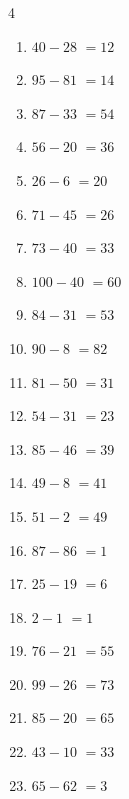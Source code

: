\begin{multicols}{4}
\begin{enumerate}
\columnbreak %

  \item $40-28$
        $=12$

  \item $95-81$
        $=14$

  \item $87-33$
        $=54$

  \item $56-20$
        $=36$

  \item $26-6$
        $=20$

  \item $71-45$
        $=26$

  \item $73-40$
        $=33$

  \item $100-40$
        $=60$

  \item $84-31$
        $=53$

  \item $90-8$
        $=82$

  \item $81-50$
        $=31$

  \item $54-31$
        $=23$

  \item $85-46$
        $=39$

  \item $49-8$
        $=41$

  \item $51-2$
        $=49$

  \item $87-86$
        $=1$

  \item $25-19$
        $=6$

  \item $2-1$
        $=1$

  \item $76-21$
        $=55$

  \item $99-26$
        $=73$

  \item $85-20$
        $=65$

  \item $43-10$
        $=33$

  \item $65-62$
        $=3$


\end{enumerate}
\end{multicols}
